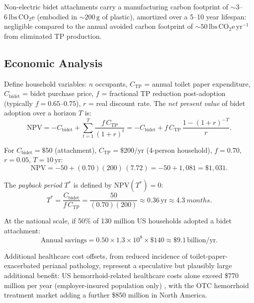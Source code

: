 \documentclass[10pt,letterpaper]{article}
\begin{document}
Non-electric bidet attachments carry a manufacturing carbon footprint of
$\sim\!3$--$6\,\mathrm{lbs\,CO_2e}$ (embodied in $\sim\!200\,\mathrm{g}$
of plastic), amortized over a 5--10 year lifespan: negligible compared to
the annual avoided carbon footprint of $\sim\!50\,\mathrm{lbs\,CO_2e\,yr^{-1}}$
from eliminated TP production.

\subsection{Economic Analysis}

Define household variables: $n$ occupants, $C_\mathrm{TP}$ = annual toilet
paper expenditure, $C_\mathrm{bidet}$ = bidet purchase price, $f$ = fractional
TP reduction post-adoption (typically $f = 0.65$--$0.75$), $r$ = real discount
rate. The \emph{net present value} of bidet adoption over a horizon $T$ is:
\begin{equation}
    \mathrm{NPV} = -C_\mathrm{bidet} + \sum_{t=1}^{T}\frac{f\,C_\mathrm{TP}}{(1+r)^t}
    = -C_\mathrm{bidet} + f\,C_\mathrm{TP}\,\frac{1-(1+r)^{-T}}{r}.
    \label{eq:npv}
\end{equation}

For $C_\mathrm{bidet} = \$50$ (attachment), $C_\mathrm{TP} = \$200/\mathrm{yr}$
(4-person household), $f = 0.70$, $r = 0.05$, $T = 10\,\mathrm{yr}$:
\begin{equation}
    \mathrm{NPV} = -50 + (0.70)(200)\,(7.72) = -50 + 1{,}081 = \$1{,}031.
    \label{eq:npvval}
\end{equation}

The \emph{payback period} $T^*$ is defined by $\mathrm{NPV}(T^*) = 0$:
\begin{equation}
    T^* = \frac{C_\mathrm{bidet}}{f\,C_\mathrm{TP}}
    = \frac{50}{(0.70)(200)} \approx 0.36\,\mathrm{yr} \approx
    4.3~months.
    \label{eq:payback}
\end{equation}

At the national scale, if 50\% of 130 million US households adopted a
bidet attachment:
\begin{equation}
    \mathrm{Annual\;savings} = 0.50 \times 1.3 \times 10^8 \times \$140
    \approx \$9.1\,\mathrm{billion/yr}.
\end{equation}

Additional healthcare cost offsets, from reduced incidence of toilet-paper-exacerbated
perianal pathology, represent a speculative but plausibly large additional
benefit: US hemorrhoid-related healthcare costs alone exceed \$770 million
per year (employer-insured population only) \citep{Peery2014}, with the OTC
hemorrhoid treatment market adding a further \$850 million in North America.
\end{document}
